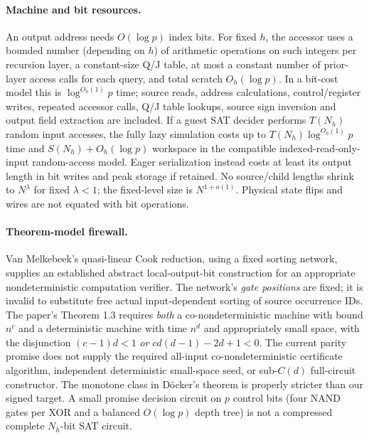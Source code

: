 \documentclass[11pt]{article}
\begin{document}
\paragraph{Machine and bit resources.} An output address needs $O(\log p)$ index bits. For fixed $h$, the accessor uses a bounded number (depending on $h$) of arithmetic operations on such integers per recursion layer, a constant-size Q/J table, at most a constant number of prior-layer access calls for each query, and total scratch $O_h(\log p)$. In a bit-cost model this is $\log^{O_h(1)}p$ time; source reads, address calculations, control/register writes, repeated accessor calls, Q/J table lookups, source sign inversion and output field extraction are included. If a guest SAT decider performs $T(N_h)$ random input accesses, the fully lazy simulation costs up to $T(N_h)\log^{O_h(1)}p$ time and $S(N_h)+O_h(\log p)$ workspace in the compatible indexed-read-only-input random-access model. Eager serialization instead costs at least its output length in bit writes and peak storage if retained. No source/child lengths shrink to $N^\lambda$ for fixed $\lambda<1$; the fixed-level size is $N^{1+o(1)}$. Physical state flips and wires are not equated with bit operations.

\paragraph{Theorem-model firewall.} Van Melkebeek's quasi-linear Cook reduction, using a fixed sorting network, supplies an established abstract local-output-bit construction for an appropriate nondeterministic computation verifier. The network's \emph{gate positions} are fixed; it is invalid to substitute free actual input-dependent sorting of source occurrence IDs. The paper's Theorem 1.3 requires \emph{both} a co-nondeterministic machine with bound $n^c$ and a deterministic machine with time $n^d$ and appropriately small space, with the disjunction $(c-1)d<1$ \emph{or} $cd(d-1)-2d+1<0$. The current parity promise does not supply the required all-input co-nondeterministic certificate algorithm, independent deterministic small-space seed, or sub-$C(d)$ full-circuit constructor. The monotone class in D\"ocker's theorem is properly stricter than our signed target. A small promise decision circuit on $p$ control bits (four NAND gates per XOR and a balanced $O(\log p)$ depth tree) is not a compressed complete $N_h$-bit SAT circuit.
\end{document}
